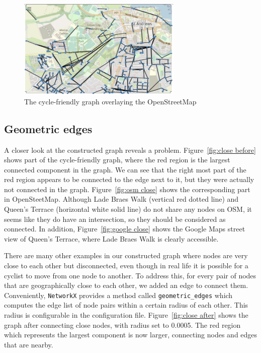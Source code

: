 \documentclass[12pt,a4paper]{report}
\begin{document}
\begin{figure}[ht]
    \centering
    \includegraphics[width=0.7\textwidth]{plan_images/graph_layout.png}
    \caption{The cycle-friendly graph overlaying the OpenStreetMap}
    \label{fig:graph layout}
\end{figure}

\subsection{Geometric edges}
A closer look at the constructed graph reveals a problem. Figure~\ref{fig:close before} shows part of the cycle-friendly graph, where the red region is the largest connected component in the graph. We can see that the right most part of the red region appears to be connected to the edge next to it, but they were actually not connected in the graph. Figure~\ref{fig:osm close} shows the corresponding part in OpenSteetMap. Although Lade Braes Walk (vertical red dotted line) and Queen's Terrace (horizontal white solid line) do not share any nodes on OSM, it seems like they do have an intersection, so they should be considered as connected. In addition, Figure~\ref{fig:google close} shows the Google Maps street view of Queen's Terrace, where Lade Braes Walk is clearly accessible.

There are many other examples in our constructed graph where nodes are very close to each other but disconnected, even though in real life it is possible for a cyclist to move from one node to another. To address this, for every pair of nodes that are geographically close to each other, we added an edge to connect them. Conveniently, \texttt{NetworkX} provides a method called \texttt{geometric\_edges} which computes the edge list of node pairs within a certain radius of each other. This radius is configurable in the configuration file. Figure~\ref{fig:close after} shows the graph after connecting close nodes, with radius set to 0.0005. The red region which represents the largest component is now larger, connecting nodes and edges that are nearby.
\end{document}
